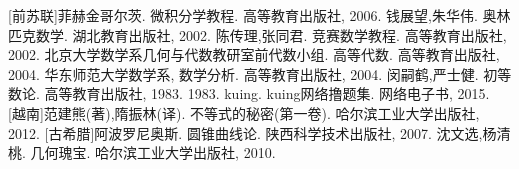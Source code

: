 
\begin{thebibliography}{99}
    [前苏联]菲赫金哥尔茨. 微积分学教程. 高等教育出版社, 2006.
    钱展望,朱华伟. 奥林匹克数学. 湖北教育出版社, 2002.
    陈传理,张同君. 竞赛数学教程. 高等教育出版社, 2002.
    北京大学数学系几何与代数教研室前代数小组. 高等代数. 高等教育出版社, 2004.
    华东师范大学数学系, 数学分析. 高等教育出版社, 2004.
    闵嗣鹤,严士健. 初等数论. 高等教育出版社, 1983. 1983.
    kuing. kuing网络撸题集. 网络电子书, 2015.
   [越南]范建熊(著),隋振林(译). 不等式的秘密(第一卷). 哈尔滨工业大学出版社, 2012.
   [古希腊]阿波罗尼奥斯. 圆锥曲线论. 陕西科学技术出版社, 2007.
   沈文选,杨清桃. 几何瑰宝. 哈尔滨工业大学出版社, 2010.
\end{thebibliography}



